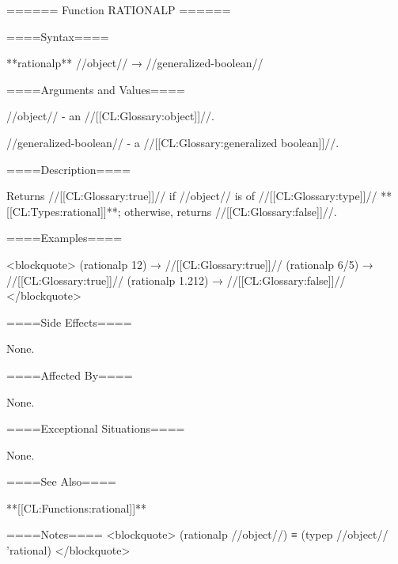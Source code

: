 ====== Function RATIONALP ======

====Syntax====

**rationalp** //object// → //generalized-boolean//

====Arguments and Values====

//object// - an //[[CL:Glossary:object]]//.

//generalized-boolean// - a //[[CL:Glossary:generalized boolean]]//.

====Description====

Returns //[[CL:Glossary:true]]// if //object// is of //[[CL:Glossary:type]]// **[[CL:Types:rational]]**; otherwise, returns //[[CL:Glossary:false]]//.

====Examples====

<blockquote> (rationalp 12) → //[[CL:Glossary:true]]// (rationalp 6/5) → //[[CL:Glossary:true]]// (rationalp 1.212) → //[[CL:Glossary:false]]// </blockquote>

====Side Effects====

None.

====Affected By====

None.

====Exceptional Situations====

None.

====See Also====

**[[CL:Functions:rational]]**

====Notes==== <blockquote> (rationalp //object//) ≡ (typep //object// 'rational) </blockquote>

